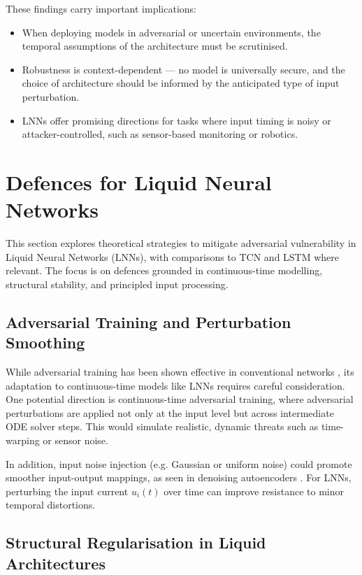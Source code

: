 These findings carry important implications:
\begin{itemize}
    \item When deploying models in adversarial or uncertain environments, the temporal assumptions of the architecture must be scrutinised.
    \item Robustness is context-dependent — no model is universally secure, and the choice of architecture should be informed by the anticipated type of input perturbation.
    \item LNNs offer promising directions for tasks where input timing is noisy or attacker-controlled, such as sensor-based monitoring or robotics.
\end{itemize}

\section{Defences for Liquid Neural Networks}

This section explores theoretical strategies to mitigate adversarial vulnerability in Liquid Neural Networks (LNNs), with comparisons to TCN and LSTM where relevant. The focus is on defences grounded in continuous-time modelling, structural stability, and principled input processing.

\subsection*{Adversarial Training and Perturbation Smoothing}

While adversarial training has been shown effective in conventional networks \cite{madry2018towards}, its adaptation to continuous-time models like LNNs requires careful consideration. One potential direction is continuous-time adversarial training, where adversarial perturbations are applied not only at the input level but across intermediate ODE solver steps. This would simulate realistic, dynamic threats such as time-warping or sensor noise.

In addition, input noise injection (e.g. Gaussian or uniform noise) could promote smoother input-output mappings, as seen in denoising autoencoders \cite{vincent2008extracting}. For LNNs, perturbing the input current $u_i(t)$ over time can improve resistance to minor temporal distortions.

\subsection*{Structural Regularisation in Liquid Architectures}

